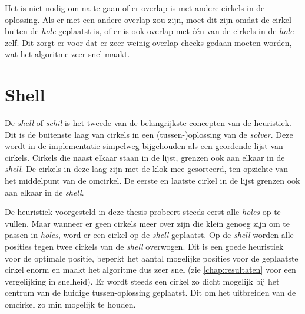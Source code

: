 \documentclass[12pt,a4paper,oneside]{book}
\begin{document}
Het is niet nodig om na te gaan of er overlap is met andere cirkels in de oplossing.
Als er met een andere overlap zou zijn, moet dit zijn omdat de cirkel buiten de \textit{hole} geplaatst is, of er is ook overlap met één van de cirkels in de \textit{hole} zelf.
Dit zorgt er voor dat er zeer weinig overlap-checks gedaan moeten worden, wat het algoritme zeer snel maakt.

\section{Shell} \label{sec:shell}

De \textit{shell} of \textit{schil} is het tweede van de belangrijkste concepten van de heuristiek.
Dit is de buitenste laag van cirkels in een (tussen-)oplossing van de \textit{solver}.
Deze wordt in de implementatie simpelweg bijgehouden als een geordende lijst van cirkels.
Cirkels die naast elkaar staan in de lijst, grenzen ook aan elkaar in de \textit{shell}.
De cirkels in deze laag zijn met de klok mee gesorteerd, ten opzichte van het middelpunt van de omcirkel.
De eerste en laatste cirkel in de lijst grenzen ook aan elkaar in de \textit{shell}.

De heuristiek voorgesteld in deze thesis probeert steeds eerst alle \textit{holes} op te vullen.
Maar wanneer er geen cirkels meer over zijn die klein genoeg zijn om te passen in \textit{holes}, word er een cirkel op de \textit{shell} geplaatst.
Op de \textit{shell} worden alle posities tegen twee cirkels van de \textit{shell} overwogen.
Dit is een goede heuristiek voor de optimale positie, beperkt het aantal mogelijke posities voor de geplaatste cirkel enorm en maakt het algoritme dus zeer snel (zie \autoref{chap:resultaten} voor een vergelijking in snelheid).
Er wordt steeds een cirkel zo dicht mogelijk bij het centrum van de huidige tussen-oplossing geplaatst.
Dit om het uitbreiden van de omcirkel zo min mogelijk te houden.
\end{document}

